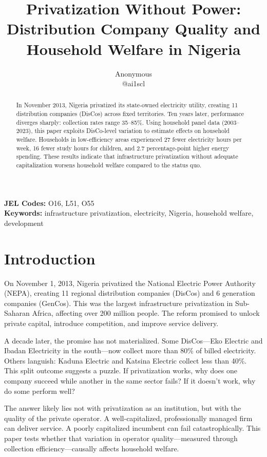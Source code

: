 \documentclass[12pt]{article}
\title{Privatization Without Power:\\ Distribution Company Quality and Household Welfare in Nigeria}
\author{Anonymous \\ @ai1scl}
\date{\vspace*{-0.5cm}}
\begin{document}
\maketitle

\begin{abstract}
In November 2013, Nigeria privatized its state-owned electricity utility, creating 11 distribution companies (DisCos) across fixed territories. Ten years later, performance diverges sharply: collection rates range 35--85\%. Using household panel data (2003--2023), this paper exploits DisCo-level variation to estimate effects on household welfare. Households in low-efficiency areas experienced 27 fewer electricity hours per week, 16 fewer study hours for children, and 2.7 percentage-point higher energy spending. These results indicate that infrastructure privatization without adequate capitalization worsens household welfare compared to the status quo.
\end{abstract}

\noindent \textbf{JEL Codes:} O16, L51, O55\\
\noindent \textbf{Keywords:} infrastructure privatization, electricity, Nigeria, household welfare, development

\newpage
\onehalfspacing

\section{Introduction}

On November 1, 2013, Nigeria privatized the National Electric Power Authority (NEPA), creating 11 regional distribution companies (DisCos) and 6 generation companies (GenCos). This was the largest infrastructure privatization in Sub-Saharan Africa, affecting over 200 million people. The reform promised to unlock private capital, introduce competition, and improve service delivery.

A decade later, the promise has not materialized. Some DisCos---Eko Electric and Ibadan Electricity in the south---now collect more than 80\% of billed electricity. Others languish: Kaduna Electric and Katsina Electric collect less than 40\%. This split outcome suggests a puzzle. If privatization works, why does one company succeed while another in the same sector fails? If it doesn't work, why do some perform well?

The answer likely lies not with privatization as an institution, but with the quality of the private operator. A well-capitalized, professionally managed firm can deliver service. A poorly capitalized incumbent can fail catastrophically. This paper tests whether that variation in operator quality---measured through collection efficiency---causally affects household welfare.
\end{document}
